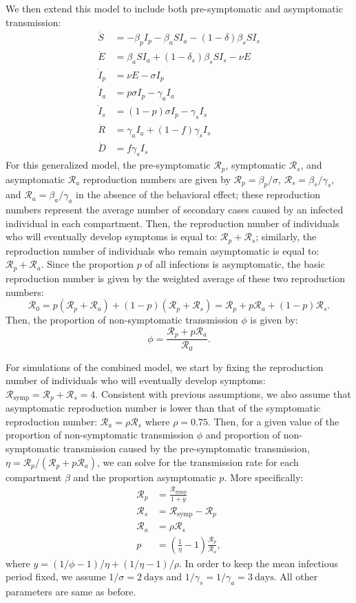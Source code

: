 \documentclass[12pt]{article}
\newcommand{\RR}{\ensuremath{{\mathcal R}}\xspace}
\begin{document}
We then extend this model to include both pre-symptomatic and asymptomatic transmission:
\begin{align}
\dot{S} &= -\beta_p I_p -\beta_a S I_a -(1-\delta) \beta_s S I_s \\
\dot{E} &= \beta_a S I_a + (1-\delta_s) \beta_s S I_s - \nu E\\
\dot{I}_p &= \nu E - \sigma I_p\\
\dot{I}_a &= p \sigma I_p - \gamma_a I_a\\
\dot{I}_s &= (1-p) \sigma I_p -\gamma_s I_s\\
\dot{R} &= \gamma_a I_a + (1-f) \gamma_s I_s \\
\dot{D} &= f \gamma_s I_s
\end{align}
For this generalized model, the pre-symptomatic $\RR_p$, symptomatic $\RR_s$, and asymptomatic $\RR_a$ reproduction numbers are given by $\RR_p = \beta_p/\sigma$, $\RR_s=\beta_s/\gamma_s$, and $\RR_a=\beta_a/\gamma_a$ in the absence of the behavioral effect;
these reproduction numbers represent the average number of secondary cases caused by an infected individual in each compartment.
Then, the reproduction number of individuals who will eventually develop symptoms is equal to: $\RR_p + \RR_s$;
similarly, the reproduction number of individuals who remain asymptomatic is equal to: $\RR_p + \RR_a$.
Since the proportion $p$ of all infections is asymptomatic, the basic reproduction number is given by the weighted average of these two reproduction numbers: 
\begin{equation}
\RR_0 = p(\RR_p + \RR_a) + (1-p) (\RR_p + \RR_s) = \RR_p + p \RR_a + (1-p) \RR_s.
\end{equation}
Then, the proportion of non-symptomatic transmission $\phi$ is given by:
\begin{equation}
\phi = \frac{\RR_p + p \RR_a}{\RR_0}.
\end{equation}

For simulations of the combined model, we start by fixing the reproduction number of individuals who will eventually develop symptoms: $\RR_{\textrm{symp}} = \RR_p + \RR_s = 4$. 
Consistent with previous assumptions, we also assume that asymptomatic reproduction number is lower than that of the symptomatic reproduction number: $\RR_a = \rho \RR_s$ where $\rho = 0.75$.
Then, for a given value of the proportion of non-symptomatic transmission $\phi$ and proportion of non-symptomatic transmission caused by the pre-symptomatic transmission, $\eta = \RR_p/(\RR_p + p \RR_a)$, we can solve for the transmission rate for each compartment $\beta$ and the proportion asymptomatic $p$.
More specifically:
\begin{align}
\RR_p &= \frac{\RR_{\textrm{symp}}}{1 + y}\\
\RR_s &= \RR_{\textrm{symp}} - \RR_p\\
\RR_a &=  \rho \RR_s\\
p &= \left(\frac{1}{\eta} - 1 \right) \frac{\RR_p}{\RR_a},
\end{align}
where $y = (1/\phi - 1)/\eta + (1/\eta - 1)/\rho$.
In order to keep the mean infectious period fixed, we assume $1/\sigma=2\ \mathrm{days}$ and $1/\gamma_s=1/\gamma_a=3\ \mathrm{days}$. All other parameters are same as before.
\end{document}
